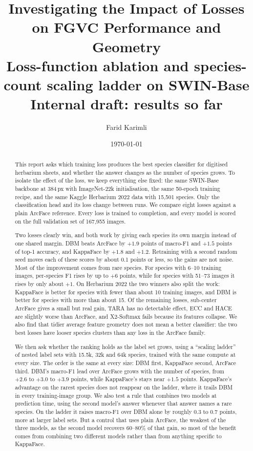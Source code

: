 \documentclass[11pt]{article}
\title{Investigating the Impact of Losses on FGVC Performance and Geometry\\[2pt]
\large Loss-function ablation and species-count scaling ladder on SWIN-Base\\[2pt]
\normalsize Internal draft: results so far}
\author{Farid Karimli}
\date{\today}
\begin{document}
\maketitle

\begin{abstract}
This report asks which training loss produces the best species classifier for
digitised herbarium sheets, and whether the answer changes as the number of species
grows. To isolate the effect of the loss, we keep everything else fixed: the same
SWIN-Base backbone at 384\,px with ImageNet-22k initialisation, the same 50-epoch
training recipe, and the same Kaggle Herbarium 2022 data with 15{,}501 species. Only
the classification head and its loss change between runs. We compare eight losses
against a plain ArcFace reference. Every loss is trained to completion, and every model
is scored on the full validation set of 167{,}955 images.

Two losses clearly win, and both work by giving each species its own margin instead of
one shared margin. DBM beats ArcFace by $+1.9$ points of macro-F1 and $+1.5$ points of
top-1 accuracy, and KappaFace by $+1.8$ and $+1.2$. Retraining with a second random seed
moves each of these scores by about 0.1 points or less, so the gains are not noise.
Most of the improvement comes from rare species. For species with 6--10 training
images, per-species F1 rises by up to $+6$ points, while for species with 51--73
images it rises by only about $+1$. On Herbarium 2022 the two winners also split the
work: KappaFace is better for species with fewer than about 10 training images, and DBM
is better for species with more than about 15. Of the remaining losses, sub-center
ArcFace gives a small but real gain, TARA has no detectable effect, ECC and HACE are
slightly worse than ArcFace, and X2-Softmax fails because its features collapse. We also
find that tidier average feature geometry does not mean a better classifier: the two
best losses have looser species clusters than any loss in the ArcFace family.

We then ask whether the ranking holds as the label set grows, using a ``scaling ladder''
of nested label sets with 15.5k, 32k and 64k species, trained with the same compute at
every size. The order is the same at every size: DBM first, KappaFace second, ArcFace
third. DBM's macro-F1 lead over ArcFace grows with the number of species, from $+2.6$ to
$+3.0$ to $+3.9$ points, while KappaFace's stays near $+1.5$ points. KappaFace's advantage
on the rarest species does not reappear on the ladder, where it trails DBM in every
training-image group. We also test a rule that combines two models at prediction time,
using the second model's answer whenever that answer names a rare species. On the ladder
it raises macro-F1 over DBM alone by roughly 0.3 to 0.7 points, more at larger label
sets. But a control that uses plain ArcFace, the weakest of the three models, as the
second model recovers 60--80\% of that gain, so most of the benefit comes from combining
two different models rather than from anything specific to KappaFace.


\end{abstract}
\end{document}
